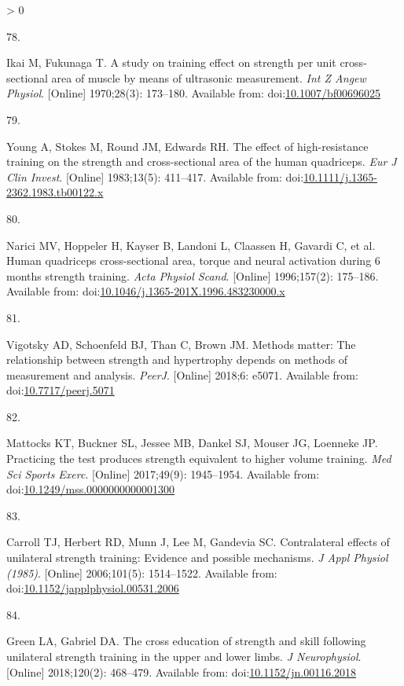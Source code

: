 \documentclass[twoside,10pt]{gihclass} %
\newlength{\cslhangindent}
\newlength{\csllabelwidth}
\newenvironment{CSLReferences}[3] %
 {%
  \setlength{\parindent}{0pt}
  \ifodd #1 \everypar{\setlength{\hangindent}{\cslhangindent}}\ignorespaces\fi
  \ifnum #2 > 0
  \setlength{\parskip}{#2\baselineskip}
  \fi
 }%
 {}
\newcommand{\CSLLeftMargin}[1]{\parbox[t]{\maxof{\widthof{#1}}{\csllabelwidth}}{#1}}
\newcommand{\CSLRightInline}[1]{\parbox[t]{\linewidth}{#1}}
\begin{document}
\begin{CSLReferences}{0}{0}
\leavevmode\hypertarget{ref-RN2629}{}%
\CSLLeftMargin{78. }
\CSLRightInline{Ikai M, Fukunaga T. A study on training effect on strength per unit cross-sectional area of muscle by means of ultrasonic measurement. \emph{Int Z Angew Physiol}. {[}Online{]} 1970;28(3): 173--180. Available from: doi:\href{https://doi.org/10.1007/bf00696025}{10.1007/bf00696025}}

\leavevmode\hypertarget{ref-RN2737}{}%
\CSLLeftMargin{79. }
\CSLRightInline{Young A, Stokes M, Round JM, Edwards RH. The effect of high-resistance training on the strength and cross-sectional area of the human quadriceps. \emph{Eur J Clin Invest}. {[}Online{]} 1983;13(5): 411--417. Available from: doi:\href{https://doi.org/10.1111/j.1365-2362.1983.tb00122.x}{10.1111/j.1365-2362.1983.tb00122.x}}

\leavevmode\hypertarget{ref-RN2735}{}%
\CSLLeftMargin{80. }
\CSLRightInline{Narici MV, Hoppeler H, Kayser B, Landoni L, Claassen H, Gavardi C, et al. Human quadriceps cross-sectional area, torque and neural activation during 6 months strength training. \emph{Acta Physiol Scand}. {[}Online{]} 1996;157(2): 175--186. Available from: doi:\href{https://doi.org/10.1046/j.1365-201X.1996.483230000.x}{10.1046/j.1365-201X.1996.483230000.x}}

\leavevmode\hypertarget{ref-RN2158}{}%
\CSLLeftMargin{81. }
\CSLRightInline{Vigotsky AD, Schoenfeld BJ, Than C, Brown JM. Methods matter: The relationship between strength and hypertrophy depends on methods of measurement and analysis. \emph{PeerJ}. {[}Online{]} 2018;6: e5071. Available from: doi:\href{https://doi.org/10.7717/peerj.5071}{10.7717/peerj.5071}}

\leavevmode\hypertarget{ref-RN2760}{}%
\CSLLeftMargin{82. }
\CSLRightInline{Mattocks KT, Buckner SL, Jessee MB, Dankel SJ, Mouser JG, Loenneke JP. Practicing the test produces strength equivalent to higher volume training. \emph{Med Sci Sports Exerc}. {[}Online{]} 2017;49(9): 1945--1954. Available from: doi:\href{https://doi.org/10.1249/mss.0000000000001300}{10.1249/mss.0000000000001300}}

\leavevmode\hypertarget{ref-RN2219}{}%
\CSLLeftMargin{83. }
\CSLRightInline{Carroll TJ, Herbert RD, Munn J, Lee M, Gandevia SC. Contralateral effects of unilateral strength training: Evidence and possible mechanisms. \emph{J Appl Physiol (1985)}. {[}Online{]} 2006;101(5): 1514--1522. Available from: doi:\href{https://doi.org/10.1152/japplphysiol.00531.2006}{10.1152/japplphysiol.00531.2006}}

\leavevmode\hypertarget{ref-RN2766}{}%
\CSLLeftMargin{84. }
\CSLRightInline{Green LA, Gabriel DA. The cross education of strength and skill following unilateral strength training in the upper and lower limbs. \emph{J Neurophysiol}. {[}Online{]} 2018;120(2): 468--479. Available from: doi:\href{https://doi.org/10.1152/jn.00116.2018}{10.1152/jn.00116.2018}}


\end{CSLReferences}
\end{document}

